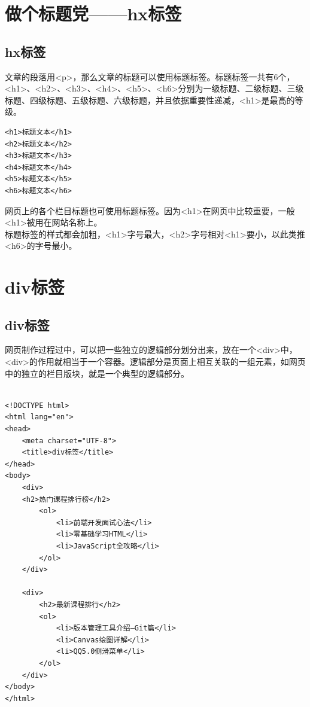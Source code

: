 \newpage

\section{做个标题党——hx标签}

\subsection{hx标签}

文章的段落用<p>，那么文章的标题可以使用标题标签。标题标签一共有6个，<h1>、<h2>、<h3>、<h4>、<h5>、<h6>分别为一级标题、二级标题、三级标题、四级标题、五级标题、六级标题，并且依据重要性递减，<h1>是最高的等级。\\

\begin{lstlisting}[style=htmlcssjs]
<h1>标题文本</h1>
<h2>标题文本</h2>
<h3>标题文本</h3>
<h4>标题文本</h4>
<h5>标题文本</h5>
<h6>标题文本</h6>
\end{lstlisting}

网页上的各个栏目标题也可使用标题标签。因为<h1>在网页中比较重要，一般<h1>被用在网站名称上。\\

标题标签的样式都会加粗，<h1>字号最大，<h2>字号相对<h1>要小，以此类推<h6>的字号最小。

\newpage

\section{div标签}

\subsection{div标签}

网页制作过程过中，可以把一些独立的逻辑部分划分出来，放在一个<div>中，<div>的作用就相当于一个容器。逻辑部分是页面上相互关联的一组元素，如网页中的独立的栏目版块，就是一个典型的逻辑部分。\\

\\

\begin{lstlisting}[style=htmlcssjs]
<!DOCTYPE html>
<html lang="en">
<head>
    <meta charset="UTF-8">
    <title>div标签</title>
</head>
<body>
    <div>
    <h2>热门课程排行榜</h2>
        <ol>
            <li>前端开发面试心法</li>
            <li>零基础学习HTML</li>
            <li>JavaScript全攻略</li>
        </ol>
    </div>

    <div>
        <h2>最新课程排行</h2>
        <ol>
            <li>版本管理工具介绍—Git篇</li>
            <li>Canvas绘图详解</li>
            <li>QQ5.0侧滑菜单</li>
        </ol>
    </div>
</body>
</html>
\end{lstlisting}

